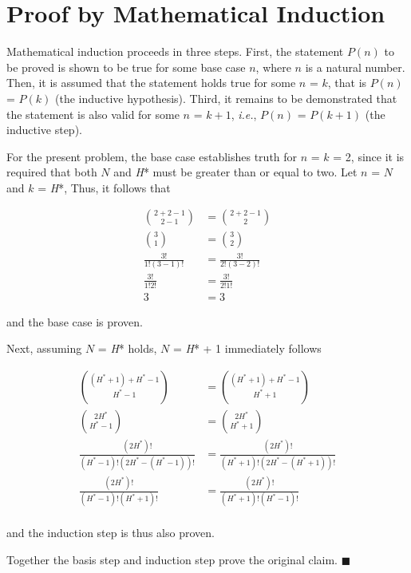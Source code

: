 \section{Proof by Mathematical Induction}

Mathematical induction proceeds in three steps. First, the statement $P(n)$ to be proved is shown to be true for some base case $n$, where $n$ is a natural number. Then, it is assumed that the statement holds true for some $n$ = $k$, that is $P(n)$ = $P(k)$ (the inductive hypothesis). Third, it remains to be demonstrated that the statement is also valid for some $n$ = $k+1$, \textit{i.e.}, $P(n)$ = $P(k+1)$ (the inductive step).

\vspace{5mm}

For the present problem, the base case establishes truth for $n$ = $k$ = 2, since it is required that both $N$ and \textit{H}* must be greater than or equal to two. Let $n$ = $N$ and $k$ = \textit{H}*, Thus, it follows that

\begin{align*}
\binom{2 + 2 - 1}{2 - 1} &= \binom{2 + 2 - 1}{2} \\
\binom{3}{1} &= \binom{3}{2} \\
\frac{3!}{1!(3-1)!} &= \frac{3!}{2!(3-2)!} \\
\frac{3!}{1!2!} &= \frac{3!}{2!1!} \\
3 &= 3
\end{align*}

\noindent and the base case is proven.

\vspace{5mm}

Next, assuming $N$ = \textit{H}* holds,  $N$ = \textit{H}* + 1 immediately follows

\begin{align*}
\binom{(H^* + 1) + H^* - 1}{H^* - 1} &= \binom{(H^* + 1) + H^* - 1}{H^* + 1} \\
\binom{2H^*}{H^* - 1} &= \binom{2H^*}{H^* + 1} \\
\frac{(2H^*)!}{(H^* - 1)!(2H^* - (H^* - 1))!} &= \frac{(2H^*)!}{(H^* + 1)!(2H^* - (H^* + 1))!} \\
\frac{(2H^*)!}{(H^* - 1)!(H^* + 1)!} &= \frac{(2H^*)!}{(H^* + 1)!(H^* - 1)!} \\
\end{align*}

\noindent and the induction step is thus also proven.

\vspace{5mm}  

Together the basis step and induction step prove the original claim. $\blacksquare$ 

